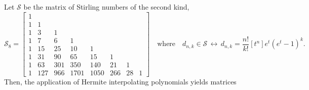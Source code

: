 
\begin{example}
Let $\mathcal{S}$ be the matrix of Stirling numbers of the second kind, 
\begin{displaymath}
\mathcal{S}_{ 8 } = \left[\begin{matrix}1 &  &  &  &  &  &  & \\1 & 1 &  &  &  &  &  & \\1 & 3 & 1 &  &  &  &  & \\1 & 7 & 6 & 1 &  &  &  & \\1 & 15 & 25 & 10 & 1 &  &  & \\1 & 31 & 90 & 65 & 15 & 1 &  & \\1 & 63 & 301 & 350 & 140 & 21 & 1 & \\1 & 127 & 966 & 1701 & 1050 & 266 & 28 & 1\end{matrix}\right]
\quad\text{where}\quad d_{n,k}\in\mathcal{S}\,\leftrightarrow\,d_{n,k}=\frac{n!}{k!}[t^{n}]e^{t}(e^{t}-1)^{k}.
\end{displaymath}
Then, the application of Hermite interpolating polynomials yields matrices
\begin{displaymath}

\end{displaymath}
\end{example}
